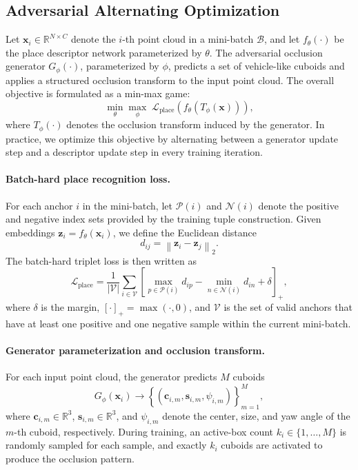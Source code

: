 \subsection{Adversarial Alternating Optimization}
\label{sec:adv_alternating_training}

Let $\mathbf{x}_i \in \mathbb{R}^{N \times C}$ denote the $i$-th point cloud in a mini-batch $\mathcal{B}$, and let
$f_{\theta}(\cdot)$ be the place descriptor network parameterized by $\theta$. The adversarial occlusion generator
$G_{\phi}(\cdot)$, parameterized by $\phi$, predicts a set of vehicle-like cuboids and applies a structured occlusion
transform to the input point cloud. The overall objective is formulated as a min-max game:
\begin{equation}
\min_{\theta} \max_{\phi} \; \mathcal{L}_{\mathrm{place}}\!\left(f_{\theta}(T_{\phi}(\mathbf{x}))\right),
\label{eq:minmax_objective}
\end{equation}
where $T_{\phi}(\cdot)$ denotes the occlusion transform induced by the generator. In practice, we optimize this
objective by alternating between a generator update step and a descriptor update step in every training iteration.

\paragraph{Batch-hard place recognition loss.}
For each anchor $i$ in the mini-batch, let $\mathcal{P}(i)$ and $\mathcal{N}(i)$ denote the positive and negative
index sets provided by the training tuple construction. Given embeddings $\mathbf{z}_i = f_{\theta}(\mathbf{x}_i)$,
we define the Euclidean distance
\begin{equation}
d_{ij} = \left\lVert \mathbf{z}_i - \mathbf{z}_j \right\rVert_2.
\end{equation}
The batch-hard triplet loss is then written as
\begin{equation}
\mathcal{L}_{\mathrm{place}}
=
\frac{1}{|\mathcal{V}|}
\sum_{i \in \mathcal{V}}
\left[
\max_{p \in \mathcal{P}(i)} d_{ip}
-
\min_{n \in \mathcal{N}(i)} d_{in}
+
\delta
\right]_+,
\label{eq:batch_hard_triplet}
\end{equation}
where $\delta$ is the margin, $[\cdot]_+ = \max(\cdot, 0)$, and $\mathcal{V}$ is the set of valid anchors that have
at least one positive and one negative sample within the current mini-batch.

\paragraph{Generator parameterization and occlusion transform.}
For each input point cloud, the generator predicts $M$ cuboids
\begin{equation}
G_{\phi}(\mathbf{x}_i)
\rightarrow
\left\{
\left(\mathbf{c}_{i,m}, \mathbf{s}_{i,m}, \psi_{i,m}\right)
\right\}_{m=1}^{M},
\end{equation}
where $\mathbf{c}_{i,m} \in \mathbb{R}^3$, $\mathbf{s}_{i,m} \in \mathbb{R}^3$, and $\psi_{i,m}$ denote the center,
size, and yaw angle of the $m$-th cuboid, respectively. During training, an active-box count $k_i \in \{1,\dots,M\}$
is randomly sampled for each sample, and exactly $k_i$ cuboids are activated to produce the occlusion pattern.

